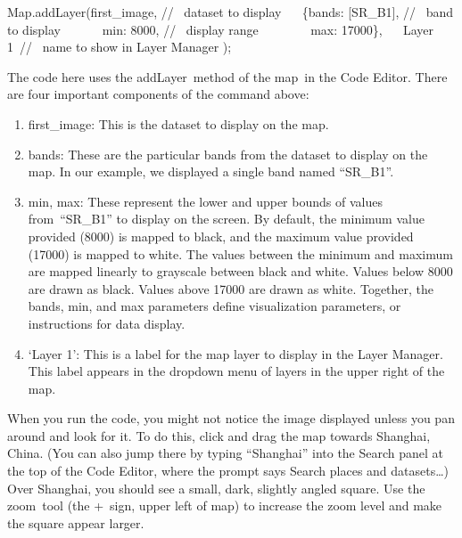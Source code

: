 \documentclass[
  letterpaper,
  DIV=11,
  numbers=noendperiod]{scrreprt}
\newenvironment{Shaded}{\begin{snugshade}}{\end{snugshade}}
\newcommand{\BuiltInTok}[1]{\textcolor[rgb]{0.00,0.23,0.31}{#1}}
\newcommand{\CommentTok}[1]{\textcolor[rgb]{0.37,0.37,0.37}{#1}}
\newcommand{\DataTypeTok}[1]{\textcolor[rgb]{0.68,0.00,0.00}{#1}}
\newcommand{\DecValTok}[1]{\textcolor[rgb]{0.68,0.00,0.00}{#1}}
\newcommand{\FunctionTok}[1]{\textcolor[rgb]{0.28,0.35,0.67}{#1}}
\newcommand{\NormalTok}[1]{\textcolor[rgb]{0.00,0.23,0.31}{#1}}
\newcommand{\OperatorTok}[1]{\textcolor[rgb]{0.37,0.37,0.37}{#1}}
\newcommand{\StringTok}[1]{\textcolor[rgb]{0.13,0.47,0.30}{#1}}
\begin{document}
\begin{Shaded}
\begin{Highlighting}[]
\BuiltInTok{Map}\OperatorTok{.}\FunctionTok{addLayer}\NormalTok{(first\_image}\OperatorTok{,} \CommentTok{//  dataset to display   }
\NormalTok{        \{}\DataTypeTok{bands}\OperatorTok{:}\NormalTok{ [}\StringTok{\textquotesingle{}SR\_B1\textquotesingle{}}\NormalTok{]}\OperatorTok{,} \CommentTok{//  band to display       }
        \DataTypeTok{min}\OperatorTok{:} \DecValTok{8000}\OperatorTok{,} \CommentTok{//  display range         }
        \DataTypeTok{max}\OperatorTok{:} \DecValTok{17000}\NormalTok{\}}\OperatorTok{,}   
        \StringTok{\textquotesingle{}Layer 1\textquotesingle{}} \CommentTok{//  name to show in Layer Manager  }
\NormalTok{        )}\OperatorTok{;}
\end{Highlighting}
\end{Shaded}

The code here uses the addLayer~method of the map~in the Code Editor.
There are four important components of the command above:

\begin{enumerate}
\def\labelenumi{\arabic{enumi}.}
\item
  first\_image: This is the dataset to display on the map.
\item
  bands: These are the particular bands from the dataset to display on
  the map. In our example, we displayed a single band named ``SR\_B1''.
\item
  min, max: These represent the lower and upper bounds of values
  from~``SR\_B1'' to display on the screen. By default, the minimum
  value provided (8000) is mapped to black, and the maximum value
  provided (17000) is mapped to white. The values between the minimum
  and maximum are mapped linearly to grayscale between black and white.
  Values below 8000 are drawn as black. Values above 17000 are drawn as
  white. Together, the bands, min, and max parameters define
  visualization parameters, or instructions for data display.
\item
  `Layer 1': This is a label for the map layer to display in the Layer
  Manager. This label appears in the dropdown menu of layers in the
  upper right of the map.
\end{enumerate}

When you run the code, you might not notice the image displayed unless
you pan around and look for it. To do this, click and drag the map
towards Shanghai, China. (You can also jump there by typing ``Shanghai''
into the Search panel at the top of the Code Editor, where the prompt
says Search places and datasets\ldots) Over Shanghai, you should see a
small, dark, slightly angled square. Use the zoom~tool (the +~sign,
upper left of map) to increase the zoom level and make the square appear
larger. ~
\end{document}
